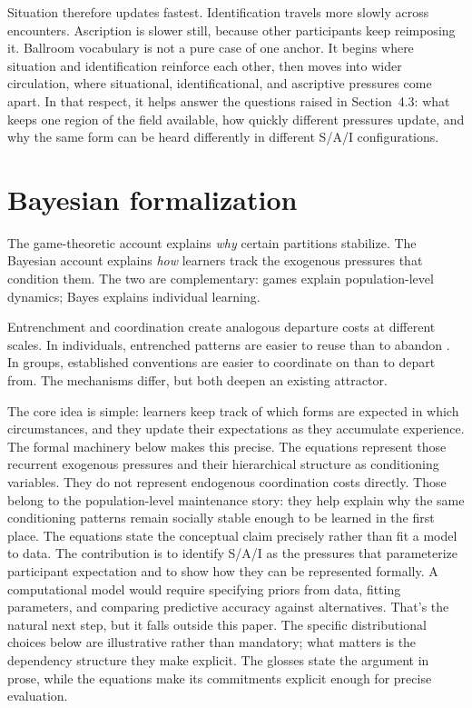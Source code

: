 \documentclass[11pt,letterpaper]{article}
\begin{document}
Situation therefore updates fastest. Identification travels more slowly across encounters. Ascription is slower still, because other participants keep reimposing it. Ballroom vocabulary is not a pure case of one anchor. It begins where situation and identification reinforce each other, then moves into wider circulation, where situational, identificational, and ascriptive pressures come apart. In that respect, it helps answer the questions raised in Section~4.3: what keeps one region of the field available, how quickly different pressures update, and why the same form can be heard differently in different S/A/I configurations.

\section{Bayesian formalization}

The game-theoretic account explains \emph{why} certain partitions stabilize. The Bayesian account explains \emph{how} learners track the exogenous pressures that condition them. The two are complementary: games explain population-level dynamics; Bayes explains individual learning.

Entrenchment and coordination create analogous departure costs at different scales. In individuals, entrenched patterns are easier to reuse than to abandon \citep{bybee2010,schmid2020}. In groups, established conventions are easier to coordinate on than to depart from. The mechanisms differ, but both deepen an existing attractor.

The core idea is simple: learners keep track of which forms are expected in which circumstances, and they update their expectations as they accumulate experience. The formal machinery below makes this precise. The equations represent those recurrent exogenous pressures and their hierarchical structure as conditioning variables. They do not represent endogenous coordination costs directly. Those belong to the population-level maintenance story: they help explain why the same conditioning patterns remain socially stable enough to be learned in the first place. The equations state the conceptual claim precisely rather than fit a model to data. The contribution is to identify S/A/I as the pressures that parameterize participant expectation and to show how they can be represented formally. A computational model would require specifying priors from data, fitting parameters, and comparing predictive accuracy against alternatives. That's the natural next step, but it falls outside this paper. The specific distributional choices below are illustrative rather than mandatory; what matters is the dependency structure they make explicit. The glosses state the argument in prose, while the equations make its commitments explicit enough for precise evaluation.
\end{document}
